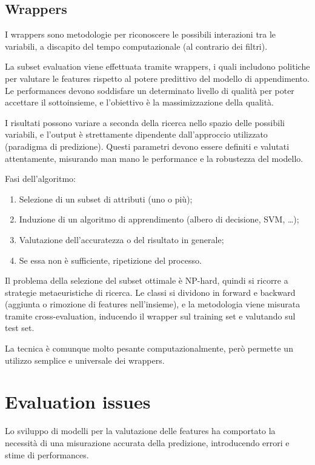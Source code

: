 \subsection{Wrappers}
I wrappers sono metodologie per riconoscere le possibili interazioni tra le variabili, a discapito del tempo computazionale (al contrario dei filtri).

La subset evaluation viene effettuata tramite wrappers, i quali includono politiche per valutare le features rispetto al potere predittivo del modello di appendimento. Le performances devono soddisfare un determinato livello di qualità per poter accettare il sottoinsieme, e l'obiettivo è la massimizzazione della qualità.

I risultati possono variare a seconda della ricerca nello spazio delle possibili variabili, e l'output è strettamente dipendente dall'approccio utilizzato (paradigma di predizione). Questi parametri devono essere definiti e valutati attentamente, misurando man mano le performance e la robustezza del modello.

Fasi dell'algoritmo:
\begin{enumerate}
	\item Selezione di un subset di attributi (uno o più);
	\item Induzione di un algoritmo di apprendimento (albero di decisione, SVM, \dots);
	\item Valutazione dell'accuratezza o del risultato in generale;
	\item Se essa non è sufficiente, ripetizione del processo.
\end{enumerate}

Il problema della selezione del subset ottimale è NP-hard, quindi si ricorre a strategie metaeuristiche di ricerca. Le classi si dividono in forward e backward (aggiunta o rimozione di features nell'insieme), e la metodologia viene misurata tramite cross-evaluation, inducendo il wrapper sul training set e valutando sul test set. 

La tecnica è comunque molto pesante computazionalmente, però permette un utilizzo semplice e universale dei wrappers.

\section{Evaluation issues}
Lo sviluppo di modelli per la valutazione delle features ha comportato la necessità di una misurazione accurata della predizione, introducendo errori e stime di performances.

